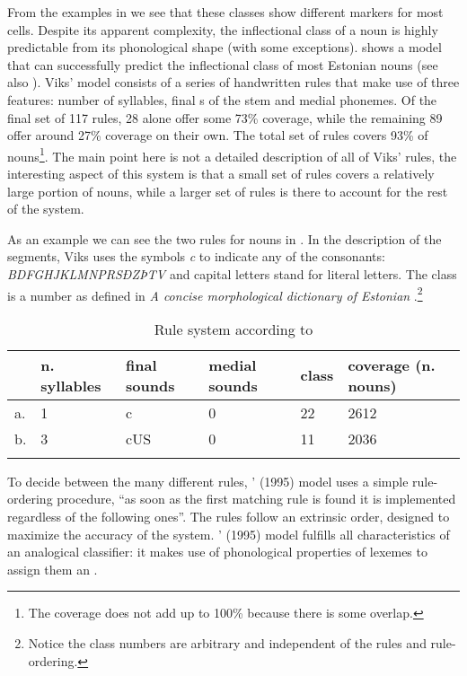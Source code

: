 From the examples in  we see that these classes show different markers for most cells. Despite its apparent complexity, the inflectional class of a noun is highly predictable from its phonological shape (with some exceptions). \textcite{Viks.1995} shows a model that can successfully predict the inflectional class of most Estonian nouns (see also \citealt{Viks.1994}). Viks' model consists of a series of handwritten rules that make use of three features: number of syllables, final s of the stem and medial phonemes. Of the final set of 117 rules, 28 alone offer some 73\% coverage, while the remaining 89 offer around 27\% coverage on their own. The total set of rules covers 93\% of nouns\footnote{The coverage does not add up to 100\% because there is some overlap.}. The main point here is not a detailed description of all of Viks' rules, the interesting aspect of this system is that a small set of rules covers a relatively large portion of nouns, while a larger set of rules is there to account for the rest of the system.

As an example we can see the two rules for nouns in . In the description of the segments, Viks uses the symbols \textit{c} to indicate any of the consonants: \textit{BDFGHJKLMNPRSÐZÞTV} and capital letters stand for literal letters. The class is a number as defined in \textit{A concise morphological dictionary of Estonian} \autocite{Viks.1992}.\footnote{Notice the class numbers are arbitrary and independent of the rules and rule-ordering.}

\begin{table}[t]
    \centering
    \caption{Rule system according to \textcite{Viks.1992}}\label{tab:exe-rules-viks}
    \begin{tabular}[t]{llllll}
      \lsptoprule
      & n. syllables & final sounds & medial sounds & class & coverage (n. nouns) \\
      \midrule
      a. & 1                   & c            & 0             & 22            & 2612          \\
      b. & 3                   & cUS          & 0             & 11            & 2036          \\
      \lspbottomrule
    \end{tabular}
\end{table}

To decide between the many different rules, \citeauthor{Viks.1995}' (1995) model uses a simple rule-ordering procedure, ``as soon as the first matching rule is found it is implemented regardless of the following ones''. The rules follow an extrinsic order, designed to maximize the accuracy of the system. \citeauthor{Viks.1995}' (1995) model fulfills all characteristics of an analogical classifier: it makes use of phonological properties of lexemes to assign them an .

